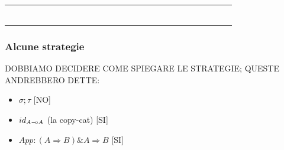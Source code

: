\documentclass{beamer}
\newcommand{\limp}{\mathbin{{-}\mkern-3.5mu{\circ}}}
\begin{document}
\begin{frame}[t]
	
	\begin{tabular}{c c c c}
		
		
		&
		
		&
		
		&
		
		\\
		
		\begin{minipage}{0.22\textwidth}
			\begin{figure}[t]
				\large
				\centering
				\def\svgwidth{0.8\textwidth}
				
			\end{figure}
		\end{minipage} &  \begin{minipage}{0.22\textwidth}
			\begin{figure}[t]
				\large
				\centering
				\def\svgwidth{0.8\textwidth}
				
			\end{figure}
		\end{minipage} & \begin{minipage}{0.22\textwidth}
			\begin{figure}[t]
				\large
				\centering
				\def\svgwidth{0.8\textwidth}
				
			\end{figure}
		\end{minipage} & \begin{minipage}{0.22\textwidth}
			\begin{figure}[t]
				\large
				\centering
				\def\svgwidth{0.8\textwidth}
				
			\end{figure}
		\end{minipage} \\
		
		
		&
		
		&
		
		&
		
		
	\end{tabular}
	

	
\end{frame}




\begin{frame}

	\frametitle{Alcune strategie}
	
	DOBBIAMO DECIDERE COME SPIEGARE LE STRATEGIE; QUESTE ANDREBBERO DETTE:
	\begin{itemize}
		\item $\sigma ; \tau$ [NO]
		\item $id_{A\limp A}$ (la copy-cat) [SI]
		\item $App:(A \Rightarrow B)\& A \Rightarrow B$ [SI]
	\end{itemize}

\end{frame}
\end{document}
